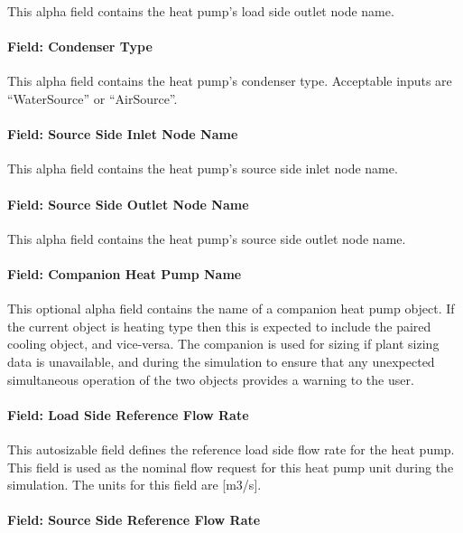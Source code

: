 This alpha field contains the heat pump's load side outlet node name.

\paragraph{Field: Condenser Type}\label{plhp_eir_condenser_type}

This alpha field contains the heat pump's condenser type. Acceptable inputs are ``WaterSource'' or ``AirSource''.

\paragraph{Field: Source Side Inlet Node Name}\label{plhp_eir_inputs_source_inlet_node}

This alpha field contains the heat pump's source side inlet node name.

\paragraph{Field: Source Side Outlet Node Name}\label{plhp_eir_inputs_source_outlet_node}

This alpha field contains the heat pump's source side outlet node name.

\paragraph{Field: Companion Heat Pump Name}\label{plhp_eir_inputs_companion_name}

This optional alpha field contains the name of a companion heat pump object. If the current object is heating type then this is expected to include the paired cooling object, and vice-versa. The companion is used for sizing if plant sizing data is unavailable, and during the simulation to ensure that any unexpected simultaneous operation of the two objects provides a warning to the user.

\paragraph{Field: Load Side Reference Flow Rate}\label{plhp_eir_inputs_load_side_flow}

This autosizable field defines the reference load side flow rate for the heat pump. This field is used as the nominal flow request for this heat pump unit during the simulation. The units for this field are [m3/s].

\paragraph{Field: Source Side Reference Flow Rate}\label{plhp_eir_inputs_source_side_flow}

